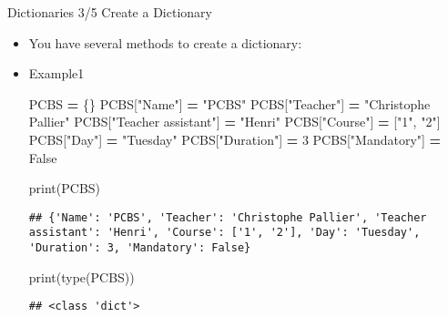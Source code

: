 \documentclass[
  8pt,
  ignorenonframetext,
]{beamer}
\newenvironment{Shaded}{\begin{snugshade}}{\end{snugshade}}
\newcommand{\BuiltInTok}[1]{#1}
\newcommand{\DecValTok}[1]{\textcolor[rgb]{0.00,0.00,0.81}{#1}}
\newcommand{\NormalTok}[1]{#1}
\newcommand{\OperatorTok}[1]{\textcolor[rgb]{0.81,0.36,0.00}{\textbf{#1}}}
\newcommand{\StringTok}[1]{\textcolor[rgb]{0.31,0.60,0.02}{#1}}
\newcommand{\VariableTok}[1]{\textcolor[rgb]{0.00,0.00,0.00}{#1}}
\providecommand{\tightlist}{%
  \setlength{\itemsep}{0pt}\setlength{\parskip}{0pt}}
\begin{document}
\begin{frame}[fragile]{Dictionaries 3/5 Create a Dictionary}
\protect\hypertarget{dictionaries-35-create-a-dictionary}{}
\begin{itemize}[<+->]
\tightlist
\item
  You have several methods to create a dictionary:
\end{itemize}

\begin{itemize}[<+->]
\item
  Example1

\begin{Shaded}
\begin{Highlighting}[]
\NormalTok{PCBS }\OperatorTok{=}\NormalTok{ \{\}}
\NormalTok{PCBS[}\StringTok{"Name"}\NormalTok{] }\OperatorTok{=} \StringTok{"PCBS"}
\NormalTok{PCBS[}\StringTok{"Teacher"}\NormalTok{] }\OperatorTok{=} \StringTok{"Christophe Pallier"}
\NormalTok{PCBS[}\StringTok{"Teacher assistant"}\NormalTok{] }\OperatorTok{=} \StringTok{"Henri"}
\NormalTok{PCBS[}\StringTok{"Course"}\NormalTok{] }\OperatorTok{=}\NormalTok{ [}\StringTok{"1"}\NormalTok{, }\StringTok{"2"}\NormalTok{]}
\NormalTok{PCBS[}\StringTok{"Day"}\NormalTok{] }\OperatorTok{=} \StringTok{"Tuesday"}
\NormalTok{PCBS[}\StringTok{"Duration"}\NormalTok{] }\OperatorTok{=} \DecValTok{3}
\NormalTok{PCBS[}\StringTok{"Mandatory"}\NormalTok{] }\OperatorTok{=} \VariableTok{False} 

\BuiltInTok{print}\NormalTok{(PCBS)}
\end{Highlighting}
\end{Shaded}

\begin{verbatim}
## {'Name': 'PCBS', 'Teacher': 'Christophe Pallier', 'Teacher assistant': 'Henri', 'Course': ['1', '2'], 'Day': 'Tuesday', 'Duration': 3, 'Mandatory': False}
\end{verbatim}

\begin{Shaded}
\begin{Highlighting}[]
\BuiltInTok{print}\NormalTok{(}\BuiltInTok{type}\NormalTok{(PCBS))}
\end{Highlighting}
\end{Shaded}

\begin{verbatim}
## <class 'dict'>
\end{verbatim}
\end{itemize}
\end{frame}
\end{document}
